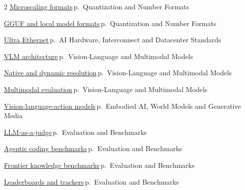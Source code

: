 \documentclass[10pt,a4paper,openany]{report}
\begin{document}
\begin{multicols}{2}
\hyperref[c:quant-0]{Microscaling formats}\,{\color{muted}\scriptsize p.\,\pageref{c:quant-0}} {\color{muted}\scriptsize Quantization and Number Formats}\par\vspace{2pt}
\hyperref[c:quant-5]{GGUF and local model formats}\,{\color{muted}\scriptsize p.\,\pageref{c:quant-5}} {\color{muted}\scriptsize Quantization and Number Formats}\par\vspace{2pt}
\hyperref[c:hardware-5]{Ultra Ethernet}\,{\color{muted}\scriptsize p.\,\pageref{c:hardware-5}} {\color{muted}\scriptsize AI Hardware, Interconnect and Datacenter Standards}\par\vspace{2pt}
\hyperref[c:vlm-0]{VLM architecture}\,{\color{muted}\scriptsize p.\,\pageref{c:vlm-0}} {\color{muted}\scriptsize Vision-Language and Multimodal Models}\par\vspace{2pt}
\hyperref[c:vlm-2]{Native and dynamic resolution}\,{\color{muted}\scriptsize p.\,\pageref{c:vlm-2}} {\color{muted}\scriptsize Vision-Language and Multimodal Models}\par\vspace{2pt}
\hyperref[c:vlm-9]{Multimodal evaluation}\,{\color{muted}\scriptsize p.\,\pageref{c:vlm-9}} {\color{muted}\scriptsize Vision-Language and Multimodal Models}\par\vspace{2pt}
\hyperref[c:embodied-0]{Vision-language-action models}\,{\color{muted}\scriptsize p.\,\pageref{c:embodied-0}} {\color{muted}\scriptsize Embodied AI, World Models and Generative Media}\par\vspace{2pt}
\hyperref[c:evals-2]{LLM-as-a-judge}\,{\color{muted}\scriptsize p.\,\pageref{c:evals-2}} {\color{muted}\scriptsize Evaluation and Benchmarks}\par\vspace{2pt}
\hyperref[c:evals-3]{Agentic coding benchmarks}\,{\color{muted}\scriptsize p.\,\pageref{c:evals-3}} {\color{muted}\scriptsize Evaluation and Benchmarks}\par\vspace{2pt}
\hyperref[c:evals-6]{Frontier knowledge benchmarks}\,{\color{muted}\scriptsize p.\,\pageref{c:evals-6}} {\color{muted}\scriptsize Evaluation and Benchmarks}\par\vspace{2pt}
\hyperref[c:evals-9]{Leaderboards and trackers}\,{\color{muted}\scriptsize p.\,\pageref{c:evals-9}} {\color{muted}\scriptsize Evaluation and Benchmarks}\par\vspace{2pt}

\end{multicols}
\end{document}
